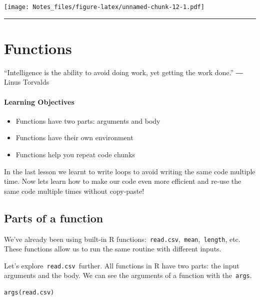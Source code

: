\documentclass[
]{book}
\providecommand{\tightlist}{%
  \setlength{\itemsep}{0pt}\setlength{\parskip}{0pt}}
\begin{document}
\texttt{[image: Notes\_files/figure-latex/unnamed-chunk-12-1.pdf]}

\begin{center}\rule{0.5\linewidth}{0.5pt}\end{center}

\hypertarget{functions}{%
\chapter{Functions}\label{functions}}

``Intelligence is the ability to avoid doing work, yet getting the work done.''
― Linus Torvalds

\hypertarget{learning-objectives-1}{%
\subsubsection*{Learning Objectives}\label{learning-objectives-1}}

\begin{itemize}
\tightlist
\item
  Functions have two parts: arguments and body
\item
  Functions have their own environment
\item
  Functions help you repeat code chunks
\end{itemize}

In the last lesson we learnt to write loops to avoid writing the same code multiple time. Now lets learn how to make our code even more efficient and re-use the same code multiple times without copy-paste!

\hypertarget{parts-of-a-function}{%
\section{Parts of a function}\label{parts-of-a-function}}

We've already been using built-in R functions:~\texttt{read.csv},~\texttt{mean},~\texttt{length}, etc. These functions allow us to run the same routine with different inputs.

Let's explore~\texttt{read.csv}~further. All functions in R have two parts: the input arguments and the body. We can see the arguments of a function with the~\texttt{args}.

\begin{verbatim}
args(read.csv)
\end{verbatim}
\end{document}
